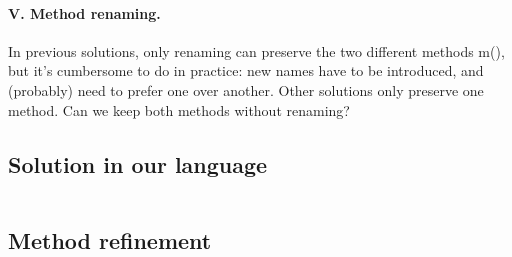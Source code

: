\paragraph{V. Method renaming.}
In previous solutions, only renaming can preserve the two different methods m(), 
but it’s cumbersome to do in practice: new names have to be introduced, and (probably) need to prefer one over another. 
Other solutions only preserve one method. Can we keep both methods without renaming?

\subsection{Solution in our language}
\begin{lstlisting}

\end{lstlisting}

\subsection{Method refinement}

